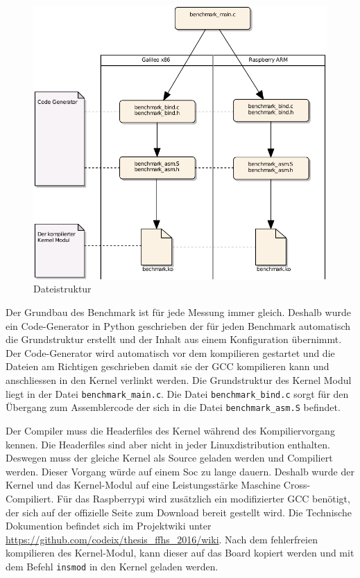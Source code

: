 \begin{figure}
\centering
\includegraphics[scale=0.8]{images/filestructure.pdf}
\caption{Dateistruktur}
\label{fig:filestructure}
\end{figure}


Der Grundbau des Benchmark ist für jede Messung immer gleich. Deshalb wurde ein Code-Generator in Python geschrieben der für jeden Benchmark automatisch die Grundstruktur erstellt und der Inhalt aus einem Konfiguration übernimmt. Der Code-Generator wird automatisch vor dem kompilieren gestartet und die Dateien am Richtigen geschrieben damit sie der GCC kompilieren kann und anschliessen in den Kernel verlinkt werden. Die Grundstruktur des Kernel Modul liegt in der Datei \texttt{benchmark\_main.c}. Die Datei \texttt{benchmark\_bind.c} sorgt für den Übergang zum Assemblercode der sich in die Datei \texttt{benchmark\_asm.S} befindet.
\par
Der Compiler muss die Headerfiles des Kernel während des Kompiliervorgang kennen. Die Headerfiles sind aber nicht in jeder Linuxdistribution enthalten. Deswegen muss der gleiche Kernel als Source geladen werden und Compiliert werden. Dieser Vorgang würde auf einem Soc zu lange dauern. Deshalb wurde der Kernel und das Kernel-Modul auf eine Leistungsstärke Maschine Cross-Compiliert. Für das Raspberrypi wird zusätzlich ein modifizierter GCC benötigt, der sich auf der offizielle Seite zum Download bereit gestellt wird. Die Technische Dokumention befindet sich im Projektwiki unter  \url{https://github.com/codeix/thesis_ffhs_2016/wiki}. Nach dem fehlerfreien kompilieren des Kernel-Modul, kann dieser auf das Board kopiert werden und mit dem Befehl \texttt{insmod} in den Kernel geladen werden.

